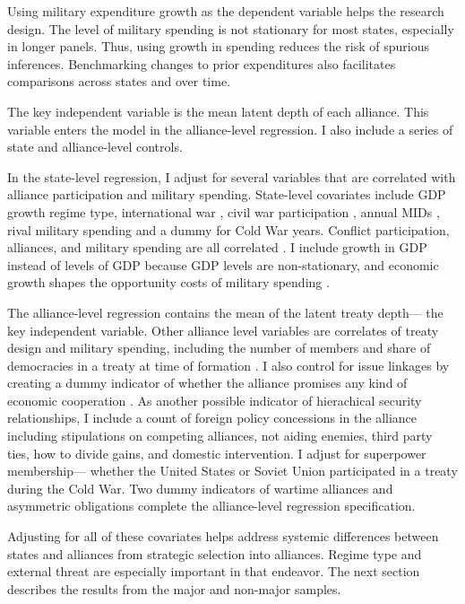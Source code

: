 \documentclass[12pt]{article}
\begin{document}
Using military expenditure growth as the dependent variable helps the research design. 
The level of military spending is not stationary for most states, especially in longer panels. 
Thus, using growth in spending reduces the risk of spurious inferences.
Benchmarking changes to prior expenditures also facilitates comparisons across states and over time. 


The key independent variable is the mean latent depth of each alliance. 
This variable enters the model in the alliance-level regression. 
I also include a series of state and alliance-level controls. 


In the state-level regression, I adjust for several variables that are correlated with alliance participation and military spending. 
State-level covariates include GDP growth \citep{Boltetal2018} regime type, international war \cite{Reiteretal2016}, civil war participation \citep{SarkeesWayman2010}, annual MIDs \citep{Gibleretal2016}, rival military spending \citep{ThompsonDreyer2012} and a dummy for Cold War years.
Conflict participation, alliances, and military spending are all correlated \citep{SeneseVasquez2008}.
I include growth in GDP instead of levels of GDP because GDP levels are non-stationary, and economic growth shapes the opportunity costs of military spending \citep{Kimball2010, Zielinskietal2017}.  


The alliance-level regression contains the mean of the latent treaty depth--- the key independent variable. 
Other alliance level variables are correlates of treaty design and military spending, including the number of members and share of democracies in a treaty at time of formation \citep{Chibaetal2015}. 
I also control for issue linkages by creating a dummy indicator of whether the alliance promises any kind of economic cooperation \citep{Poast2013, LongLeeds2006}. 
As another possible indicator of hierachical security relationships, I include a count of foreign policy concessions in the alliance including stipulations on competing alliances, not aiding enemies, third party ties, how to divide gains, and domestic intervention. 
I adjust for superpower membership--- whether the United States or Soviet Union participated in a treaty during the Cold War. 
Two dummy indicators of wartime alliances and asymmetric obligations \citep{Leedsetal2002} complete the alliance-level regression specification. 


Adjusting for all of these covariates helps address systemic differences between states and alliances from strategic selection into alliances. 
Regime type and external threat are especially important in that endeavor. 
The next section describes the results from the major and non-major samples.
 
\end{document}
